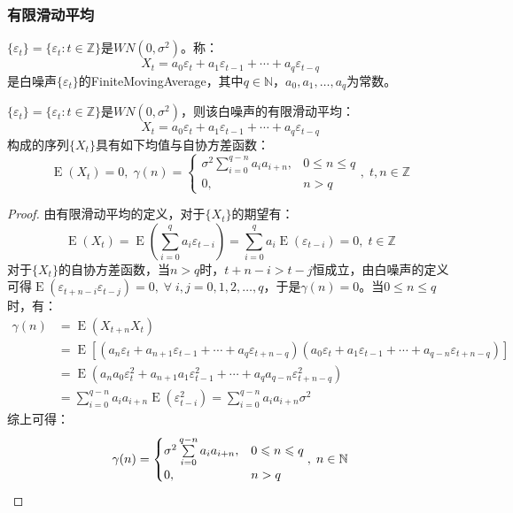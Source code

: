 \subsubsection{有限滑动平均}
\begin{definition}
	$\{\varepsilon_t\}=\{\varepsilon_t:t\in\mathbb{Z}\}$是$WN(0,\sigma^2)$。称：
	\begin{equation*}
		X_t=a_0\varepsilon_t+a_1\varepsilon_{t-1}+\cdots+a_q\varepsilon_{t-q}
	\end{equation*}
	是白噪声$\{\varepsilon_t\}$的\gls{FiniteMovingAverage}，其中$q\in\mathbb{N}$，$a_0,a_1,\dots,a_q$为常数。
\end{definition}
\begin{theorem}
	$\{\varepsilon_t\}=\{\varepsilon_t:t\in\mathbb{Z}\}$是$WN(0,\sigma^2)$，则该白噪声的有限滑动平均：
	\begin{equation*}
		X_t=a_0\varepsilon_t+a_1\varepsilon_{t-1}+\cdots+a_q\varepsilon_{t-q}
	\end{equation*}
	构成的序列$\{X_t\}$具有如下均值与自协方差函数：
	\begin{equation*}
		\operatorname{E}(X_t)=0,\;
		\gamma(n)=
		\begin{cases}
			\sigma^2\sum\limits_{i=0}^{q-n}a_ia_{i+n}, & 0\leqslant n\leqslant q \\
			0, & n>q
		\end{cases},\;t,n\in\mathbb{Z}
	\end{equation*}
\end{theorem}
\begin{proof}
	由有限滑动平均的定义，对于$\{X_t\}$的期望有：
	\begin{equation*}
		\operatorname{E}(X_t)=\operatorname{E}\left(\sum_{i=0}^{q}a_i\varepsilon_{t-i}\right)=\sum_{i=0}^{q}a_i\operatorname{E}(\varepsilon_{t-i})=0,\;t\in\mathbb{Z}
	\end{equation*}
	对于$\{X_t\}$的自协方差函数，当$n>q$时，$t+n-i>t-j$恒成立，由白噪声的定义可得$\operatorname{E}(\varepsilon_{t+n-i}\varepsilon_{t-j})=0,\;\forall\;i,j=0,1,2,\dots,q$，于是$\gamma(n)=0$。当$0\leqslant n\leqslant q$时，有：
	\begin{align*}
		\gamma(n)
		&=\operatorname{E}(X_{t+n}X_t) \\
		&=\operatorname{E}[(a_{n}\varepsilon_{t}+a_{n+1}\varepsilon_{t-1}+\cdots+a_{q}\varepsilon_{t+n-q})(a_0\varepsilon_t+a_1\varepsilon_{t-1}+\cdots+a_{q-n}\varepsilon_{t+n-q})] \\
		&=\operatorname{E}(a_na_0\varepsilon_t^2+a_{n+1}a_1\varepsilon_{t-1}^2+\cdots+a_qa_{q-n}\varepsilon_{t+n-q}^2) \\
		&=\sum_{i=0}^{q-n}a_ia_{i+n}\operatorname{E}(\varepsilon_{t-i}^2)
		=\sum_{i=0}^{q-n}a_ia_{i+n}\sigma^2
	\end{align*}
	综上可得：
	\begin{equation*}
		\gamma(n)=
		\begin{cases}
			\sigma^2\sum\limits_{i=0}^{q-n}a_ia_{i+n}, & 0\leqslant n\leqslant q \\
			0, & n>q
		\end{cases},\;n\in\mathbb{N}\qedhere
	\end{equation*}
\end{proof}
